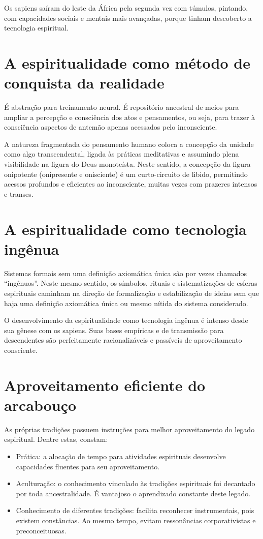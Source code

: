 \documentclass[a4paper]{article}
\begin{document}
Os sapiens saíram do leste da África pela segunda vez com túmulos, pintando, com
capacidades sociais e mentais mais avançadas, porque tinham descoberto a
tecnologia espiritual.

\section{A espiritualidade como método de conquista da realidade}\label{met}

É abstração para treinamento neural. É repositório ancestral de meios para
ampliar a percepção e consciência dos atos e pensamentos, ou seja, para trazer à
consciência aspectos de antemão apenas acessados pelo inconsciente.

A natureza fragmentada do pensamento humano coloca a concepção da unidade como
algo transcendental, ligada às práticas meditativas e assumindo plena
visibilidade na figura do Deus monoteísta. Neste sentido, a concepção da figura
onipotente (onipresente e onisciente) é um curto-circuito de libido, permitindo
acessos profundos e eficientes ao inconsciente, muitas vezes com prazeres
intensos e transes.

\section{A espiritualidade como tecnologia ingênua}

Sistemas formais sem uma definição axiomática única são por vezes chamados
``ingênuos''. Neste mesmo sentido, os símbolos, rituais e sistematizações de
esferas espirituais caminham na direção de formalização e estabilização de
ideias sem que haja uma definição axiomática única ou mesmo nítida do sistema
considerado.

O desenvolvimento da espiritualidade como tecnologia ingênua é intenso desde sua
gênese com os sapiens. Suas bases empíricas e de transmissão para descendentes
são perfeitamente racionalizáveis e passíveis de aproveitamento consciente.

\section{Aproveitamento eficiente do arcabouço}

As próprias tradições possuem instruções para melhor aproveitamento do legado
espiritual. Dentre estas, constam:

\begin{itemize}
  \item Prática: a alocação de tempo para atividades espirituais desenvolve
  capacidades fluentes para seu aproveitamento.

  \item Aculturação: o conhecimento vinculado às tradições espirituais foi
  decantado por toda ancestralidade. É vantajoso o aprendizado constante deste
  legado.

  \item Conhecimento de diferentes tradições: facilita reconhecer instrumentais,
  pois existem constâncias. Ao mesmo tempo, evitam ressonâncias corporativistas
  e preconceituosas.
\end{itemize}
\end{document}
